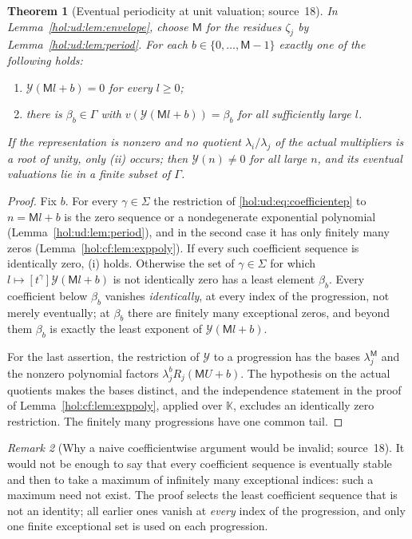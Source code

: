 \documentclass[11pt]{article}
\numberwithin{equation}{section}
\newtheorem{theorem}{Theorem}[section]
\theoremstyle{definition}
\theoremstyle{remark}
\newtheorem{remark}[theorem]{Remark}
\newcommand{\KK}{\mathbb K}
\begin{document}
\begin{theorem}[Eventual periodicity at unit valuation; source~18]
\label{hol:ud:thm:unitvalues}
In Lemma~\ref{hol:ud:lem:envelope}, choose $\mathsf M$ for the residues
$\zeta_j$ by Lemma~\ref{hol:ud:lem:period}. For each
$b\in\{0,\ldots,\mathsf M-1\}$ exactly one of the following holds:
\begin{enumerate}[label=\textup{(\roman*)}]
\item $\mathcal Y(\mathsf Ml+b)=0$ for every $l\ge0$;
\item there is $\beta_b\in\Gamma$ with $v(\mathcal Y(\mathsf Ml+b))=\beta_b$
for all sufficiently large $l$.
\end{enumerate}
If the representation is nonzero and no quotient $\lambda_i/\lambda_j$ of the
actual multipliers is a root of unity, only (ii) occurs; then
$\mathcal Y(n)\ne0$ for all large $n$, and its eventual valuations lie in a
finite subset of $\Gamma$.
\end{theorem}

\begin{proof}
Fix $b$. For every $\gamma\in\Sigma$ the restriction of
\eqref{hol:ud:eq:coefficientep} to $n=\mathsf Ml+b$ is the zero sequence or a
nondegenerate exponential polynomial (Lemma~\ref{hol:ud:lem:period}), and in
the second case it has only finitely many zeros
(Lemma~\ref{hol:cf:lem:exppoly}). If every such coefficient sequence is
identically zero, (i) holds. Otherwise the set of $\gamma\in\Sigma$ for which
$l\mapsto[t^\gamma]\mathcal Y(\mathsf Ml+b)$ is not identically zero has a
least element $\beta_b$. Every coefficient below $\beta_b$ vanishes
\emph{identically}, at every index of the progression, not merely eventually;
at $\beta_b$ there are finitely many exceptional zeros, and beyond them
$\beta_b$ is exactly the least exponent of $\mathcal Y(\mathsf Ml+b)$.

For the last assertion, the restriction of $\mathcal Y$ to a progression has
the bases $\lambda_j^{\mathsf M}$ and the nonzero polynomial factors
$\lambda_j^bR_j(\mathsf MU+b)$. The hypothesis on the actual quotients makes
the bases distinct, and the independence statement in the proof of
Lemma~\ref{hol:cf:lem:exppoly}, applied over $\KK$, excludes an identically
zero restriction. The finitely many progressions have one common tail.
\end{proof}

\begin{remark}[Why a naive coefficientwise argument would be invalid;
source~18]\label{hol:ud:rem:uniform}
It would not be enough to say that every coefficient sequence is eventually
stable and then to take a maximum of infinitely many exceptional indices: such
a maximum need not exist. The proof selects the least coefficient sequence
that is not an identity; all earlier ones vanish at \emph{every} index of the
progression, and only one finite exceptional set is used on each progression.
\end{remark}
\end{document}
